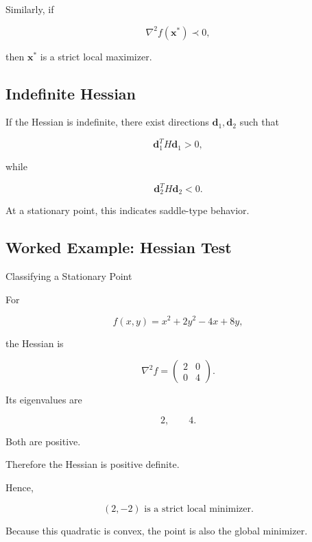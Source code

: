 Similarly, if

\[
\boxed{
\nabla^2f(\mathbf{x}^*)
\prec0,
}
\]

then \(\mathbf{x}^*\) is a strict local maximizer.

\subsection{Indefinite Hessian}
\label{subsec:indefinite-hessian}

If the Hessian is indefinite, there exist directions
\(\mathbf{d}_1,\mathbf{d}_2\) such that

\[
\mathbf{d}_1^TH\mathbf{d}_1>0,
\]

while

\[
\mathbf{d}_2^TH\mathbf{d}_2<0.
\]

At a stationary point, this indicates saddle-type behavior.

\subsection{Worked Example: Hessian Test}
\label{subsec:worked-hessian-test}

\begin{workedexamplebox}{Classifying a Stationary Point}

For

\[
f(x,y)
=
x^2+2y^2-4x+8y,
\]

the Hessian is

\[
\nabla^2f
=
\begin{pmatrix}
2&0\\
0&4
\end{pmatrix}.
\]

Its eigenvalues are

\[
2,
\qquad
4.
\]

Both are positive.

Therefore the Hessian is positive definite.

Hence,

\begin{answerbox}
\[
\boxed{
(2,-2)
\text{ is a strict local minimizer}.
}
\]
\end{answerbox}

Because this quadratic is convex, the point is also the global minimizer.

\end{workedexamplebox}

